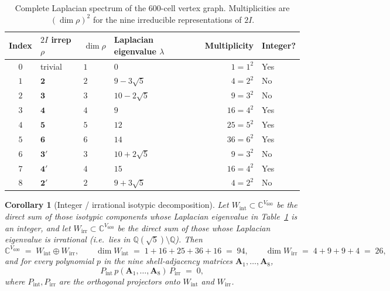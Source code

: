 \documentclass[11pt, a4paper]{amsart}
\newtheorem{corollary}[theorem]{Corollary}
\theoremstyle{definition}
\newcommand{\Q}{\mathbb{Q}}
\newcommand{\C}{\mathbb{C}}
\begin{document}
\begin{table}[ht]
\centering
\caption{Complete Laplacian spectrum of the $600$-cell vertex
graph. Multiplicities are $(\dim\rho)^2$ for the nine irreducible
representations of $2I$.}
\label{tab:P2-spectrum}
\begin{tabular}{@{}clllrl@{}}
\toprule
Index & $2I$ irrep $\rho$ & $\dim \rho$ & Laplacian eigenvalue $\lambda$ & Multiplicity & Integer? \\
\midrule
$0$ & trivial       & $1$ & $0$              & $1  = 1^2$ & Yes \\
$1$ & $\mathbf{2}$  & $2$ & $9 - 3\sqrt 5$   & $4  = 2^2$ & No  \\
$2$ & $\mathbf{3}$  & $3$ & $10 - 2\sqrt 5$  & $9  = 3^2$ & No  \\
$3$ & $\mathbf{4}$  & $4$ & $9$              & $16 = 4^2$ & Yes \\
$4$ & $\mathbf{5}$  & $5$ & $12$             & $25 = 5^2$ & Yes \\
$5$ & $\mathbf{6}$  & $6$ & $14$             & $36 = 6^2$ & Yes \\
$6$ & $\mathbf{3'}$ & $3$ & $10 + 2\sqrt 5$  & $9  = 3^2$ & No  \\
$7$ & $\mathbf{4'}$ & $4$ & $15$             & $16 = 4^2$ & Yes \\
$8$ & $\mathbf{2'}$ & $2$ & $9 + 3\sqrt 5$   & $4  = 2^2$ & No  \\
\bottomrule
\end{tabular}
\end{table}

\begin{corollary}[Integer / irrational isotypic decomposition]
\label{cor:94-26-split}
Let $W_{\mathrm{int}} \subset \C^{V_{600}}$ be the direct sum of
those isotypic components whose Laplacian eigenvalue in
Table~\ref{tab:P2-spectrum} is an integer, and let $W_{\mathrm{irr}}
\subset \C^{V_{600}}$ be the direct sum of those whose Laplacian
eigenvalue is irrational (i.e.\ lies in $\Q(\sqrt 5) \setminus
\Q$). Then
\begin{equation}
  \C^{V_{600}} \;=\; W_{\mathrm{int}} \oplus W_{\mathrm{irr}},
  \qquad
  \dim W_{\mathrm{int}} \;=\; 1 + 16 + 25 + 36 + 16 \;=\; 94,
  \qquad
  \dim W_{\mathrm{irr}} \;=\; 4 + 9 + 9 + 4 \;=\; 26,
\end{equation}
and for every polynomial $p$ in the nine shell-adjacency matrices
$\mathbf{A}_1, \ldots, \mathbf{A}_8$,
\begin{equation}
  P_{\mathrm{int}} \, p(\mathbf{A}_1, \ldots, \mathbf{A}_8) \,
  P_{\mathrm{irr}} \;=\; 0,
\end{equation}
where $P_{\mathrm{int}}, P_{\mathrm{irr}}$ are the orthogonal
projectors onto $W_{\mathrm{int}}$ and $W_{\mathrm{irr}}$.
\end{corollary}
\end{document}
